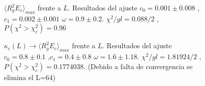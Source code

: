 \begin{figure}[h]
  \centering
  
  \caption{$\langle R_g^2 E_c\rangle_{max}$ frente a $L$. Resultados del
    ajuste $c_0=0.001\pm 0.008$ ,$c_1=0.002\pm 0.001 $ $\omega=0.9 \pm
    0.2$. $\chi^2/gl=0.088/2$ , $P(\chi^2>\chi_c^2)=0.96$ }






\end{figure}

\begin{figure}[h]
  \centering
  
  \caption{$\kappa_c(L)\rightarrow\langle R_g^2 E_c\rangle_{max}$ frente a $L$. Resultados del ajuste $c_0=0.8\pm 0.1$ ,$c_1=0.4\pm 0.8 $ $\omega=1.6 \pm
    1.18$. $\chi^2/gl=1.81924/2$ , $P(\chi^2>\chi_c^2)=0.1774038$. (Debido a falta de convergencia se elimina el L=64)}







\end{figure}
\clearpage

